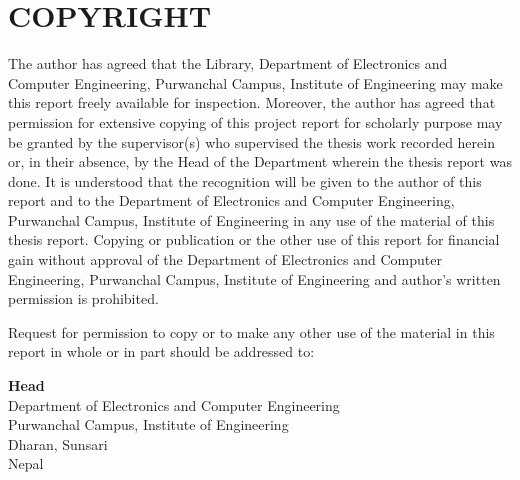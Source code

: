\chapter*{COPYRIGHT\textcopyright}

The author has agreed that the Library, Department of Electronics and Computer Engineering, Purwanchal Campus, Institute of Engineering may make this report freely available for inspection. Moreover, the author has agreed that permission for extensive copying of this project report for scholarly purpose may be granted by the supervisor(s) who supervised the thesis work recorded herein or, in their absence, by the Head of the Department wherein the thesis report was done. It is understood that the recognition will be given to the author of this report and to the Department of Electronics and Computer Engineering, Purwanchal Campus, Institute of Engineering in any use of the material of this thesis report. Copying or publication or the other use of this report for financial gain without approval of the Department of Electronics and Computer Engineering, Purwanchal Campus, Institute of Engineering and author’s written permission is prohibited.

\vspace{1cm}

Request for permission to copy or to make any other use of the material in this report in whole or in part should be addressed to:

\vspace{1cm}

\noindent
\textbf{Head} \\
Department of Electronics and Computer Engineering \\
Purwanchal Campus, Institute of Engineering \\
Dharan, Sunsari \\
Nepal

\newpage

